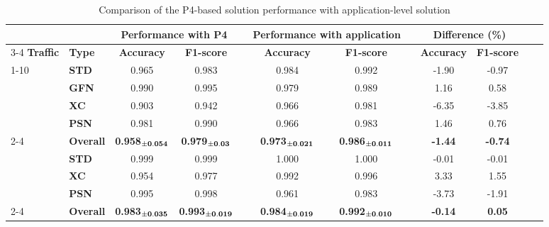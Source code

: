 \begin{table}[!t]

    \caption{Comparison of the P4-based solution performance with application-level solution}
    \label{tab:chap_4:usad_p4_performance}
    \setlength\tabcolsep{1pt} 
    
    \begin{tabular*}{\linewidth}{@{\extracolsep{\fill}} llcccccccccc}
    \toprule
         & & \multicolumn{2}{c}{\bf Performance with P4} & & \multicolumn{2}{c}{\bf Performance with application} & & \multicolumn{2}{c}{\bf Difference (\%)}\\
    \cmidrule{3-4}  \cmidrule{6-7} \cmidrule{9-10}
        \bf Traffic & \bf Type & \bf Accuracy & \bf F1-score && \bf Accuracy & \bf F1-score && \bf Accuracy & \bf F1-score\\
    
    \cmidrule{1-10}
        \multirow{5}{*}{\rotatebox[origin=c]{0}{\bf Normal CG}} & \bf STD & 0.965 & 0.983 && 0.984 & 0.992 && -1.90 & -0.97\\
                                                                & \bf GFN & 0.990 & 0.995 && 0.979 & 0.989 && 1.16 & 0.58\\
                                                                & \bf XC & 0.903 & 0.942 && 0.966 & 0.981 && -6.35 & -3.85 \\
                                                                & \bf PSN & 0.981 & 0.990 && 0.966 & 0.983 && 1.46 & 0.76 \\
        \cmidrule{2-4} \cmidrule{6-7} \cmidrule{9-10}
                                                                & \bf Overall & \bf 0.958$_{\bf \pm0.054}$ & \bf 0.979$_{\bf \pm0.03}$ && \bf 0.973$_{\bf \pm0.021}$ & \bf 0.986$_{\bf \pm0.011}$ && \bf -1.44 & \bf -0.74\\
    \addlinespace    
    \cmidrule{1-10}
    
        \multirow{4}{*}{\rotatebox[origin=c]{0}{\parbox{15mm}{\bf CG with network constraints}}} & \bf STD & 0.999 & 0.999 && 1.000 & 1.000 && -0.01 & -0.01\\
                                                            & \bf XC & 0.954 & 0.977 && 0.992 & 0.996 && 3.33 & 1.55\\
                                                            & \bf PSN & 0.995 & 0.998 && 0.961 & 0.983 && -3.73 & -1.91\\
        \cmidrule{2-4} \cmidrule{6-7} \cmidrule{9-10}
                                                                    & \bf Overall & \bf 0.983$_{\bf \pm0.035}$ & \bf 0.993$_{\bf \pm0.019}$ && \bf 0.984$_{\bf \pm0.019}$ & \bf 0.992$_{\bf \pm0.010}$ && \bf -0.14 & \bf 0.05\\


\end{tabular*}
\end{table}
